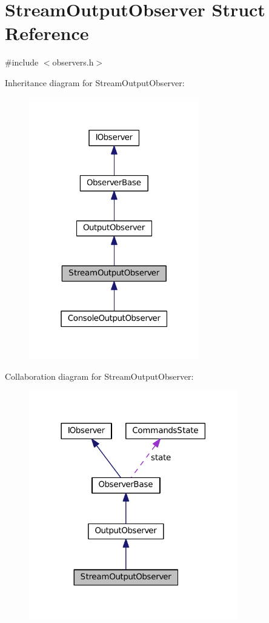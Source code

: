\hypertarget{struct_stream_output_observer}{}\section{Stream\+Output\+Observer Struct Reference}
\label{struct_stream_output_observer}


{\ttfamily \#include $<$observers.\+h$>$}



Inheritance diagram for Stream\+Output\+Observer\+:
\nopagebreak
\begin{figure}[H]
\begin{center}
\leavevmode
\includegraphics[width=211pt]{struct_stream_output_observer__inherit__graph}
\end{center}
\end{figure}


Collaboration diagram for Stream\+Output\+Observer\+:
\nopagebreak
\begin{figure}[H]
\begin{center}
\leavevmode
\includegraphics[width=258pt]{struct_stream_output_observer__coll__graph}
\end{center}
\end{figure}

